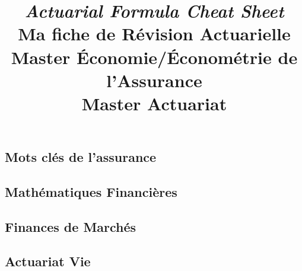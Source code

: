 \documentclass[french,a4paper]{article}
\title{
\author{}
\emph{Actuarial Formula Cheat Sheet}\\
Ma fiche de Révision Actuarielle\\\medskip\small
Master Économie/Économétrie de l'Assurance\\
Master Actuariat}
\theoremstyle{sansparenthese}
\begin{document}
\maketitle
%
 \setcounter{higher}{1}
\begin{center}

\end{center}
\newpage

\begin{center}
	\bigskip

\section*{Mots clés de l'assurance}
    \medskip
\end{center}


\begin{multicols}{2}
	

\end{multicols}

\begin{center}
	\section*{Mathématiques Financières}
	\medskip
\end{center}


\begin{multicols}{2}
	
	
\end{multicols}

\newpage
\begin{center}
\section*{Finances de Marchés}
    \medskip
\end{center}

\begin{multicols}{2}


\end{multicols}

\newpage
\begin{center}
\section*{Actuariat Vie}
    \medskip
\end{center}

\begin{multicols}{2}
	

\end{multicols}
\end{document}
